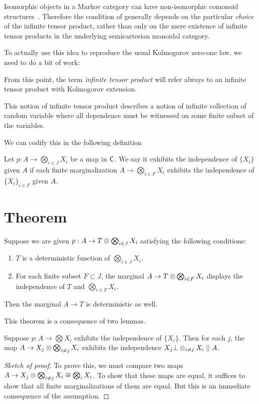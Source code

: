 \documentclass[11pt]{article}
\begin{document}
\begin{remark}
    Isomorphic objects in a Markov category can have non-isomorphic comonoid structures~\cite[Remark~10.9]{markov_cats}.
    Therefore the condition of  generally depends on the particular \emph{choice} of the infinite tensor product, rather than only on the mere existence of infinite tensor products in the underlying semicartesian monoidal category.
\end{remark}


To actually use this idea to reproduce the usual Kolmogorov zero-one law, we need to do a bit of work:

From this point, the term \emph{infinite tensor product} will refer always to an infinite tensor product with Kolmogorov extension.

This notion of infinite tensor product describes a notion of infinite collection of random variable where all dependence must be witnessed on some finite subset of the variables.

We can codify this in the following definition
\begin{definition}
    Let $p: A \to \bigotimes_{i\in J}X_i$ be a map in $\mathsf{C}$.
    We say it exhibits the independence of $\{X_i\}$ given $A$ if each finite marginalization $A \to \bigotimes_{i \in F}X_i$ exhibits the independence of $\{X_i\}_{i \in F}$ given $A$.
\end{definition}

\section{Theorem}
\begin{theorem}
    \label{thm:kolmog}
    Suppose we are given $p: A \to T \otimes \bigotimes_{i \in J} X_i$ satisfying the following conditions:
    \begin{enumerate}
        \item $T$ is a deterministic function of $\bigotimes_{i \in J} X_i$.
        \item For each finite subset $F \subset J$, the marginal $A \to T \otimes \bigotimes_{i \in F}X_i$ displays the independence of $T$ and $\bigotimes_{i \in F} X_i$.
    \end{enumerate}
    Then the marginal $A \to T$ is deterministic as well.
\end{theorem}

This theorem is a consequence of two lemmas.
\begin{lemma}
    Suppose $p: A \to \bigotimes X_i$ exhibits the independence of $\{X_i\}$.
    Then for each $j$, the map $A \to X_j \otimes \bigotimes_{i \neq j}X_i$ exhibits the independence $X_j \bot \otimes_{i\neq j} X_i \mid \mid A$.
\end{lemma}
\begin{proof}[Sketch of proof]
    To prove this, we must compare two maps $A \to X_j \otimes \bigotimes_{i\neq j} X_i \cong \bigotimes_i X_i$.
    To show that these maps are equal, it suffices to show that all finite marginalizations of them are equal.
    But this is an immediate consequence of the assumption.
\end{proof}
\end{document}
